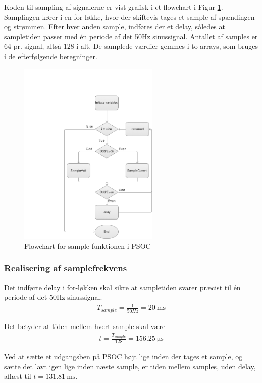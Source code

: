 Koden til sampling af signalerne er vist grafisk i et flowchart i Figur \ref{fig:MEsample}. Samplingen kører i en for-løkke, hvor der skiftevis tages et sample af spændingen og strømmen. Efter hver anden sample, indføres der et delay, således at sampletiden passer med én periode af det 50Hz sinussignal. Antallet af samples er 64 pr. signal, altså 128 i alt. De samplede værdier gemmes i to arrays, som bruges i de efterfølgende beregninger. 


\begin{figure}[htbp] %
	\centering
	\includegraphics[width=0.6\textwidth]{Figure/MEsample}
	\caption{Flowchart for sample funktionen i PSOC}
	\label{fig:MEsample}
\end{figure}

\subsubsection{Realisering af samplefrekvens}

Det indførte delay i for-løkken skal sikre at sampletiden svarer præcist til én periode af det 50Hz sinussignal.
\begin{align}
T_{sample} = \frac{1}{50Hz} = \SI{20}{\milli\second}
\end{align}

Det betyder at tiden mellem hvert sample skal være
\begin{align}
t = \frac{T_{sample}}{128} = \SI{156,25} {\micro\second}
\end{align}

Ved at sætte et udgangsben på PSOC højt lige inden der tages et sample, og sætte det lavt igen lige inden næste sample, er tiden mellem samples, uden delay, aflæst til $t = \SI{131,81}{\milli\second}.$


